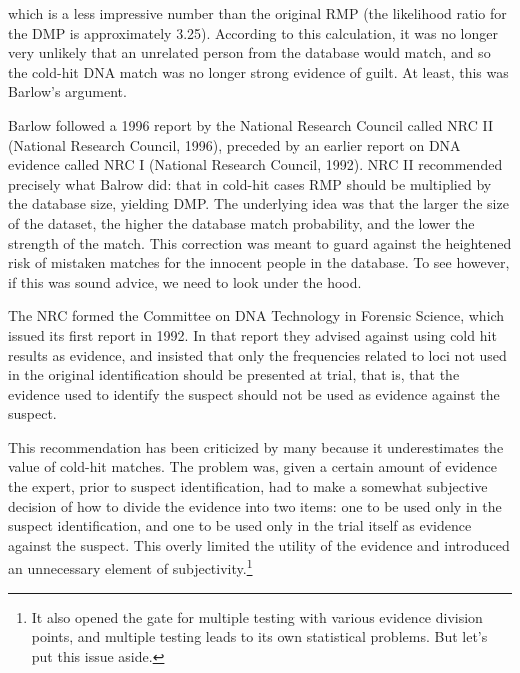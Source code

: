 \documentclass[10pt,dvipsnames,enabledeprecatedfontcommands]{scrartcl}
\begin{document}
\noindent which is a less impressive number than the original RMP (the
likelihood ratio for the DMP is approximately 3.25). According to this
calculation, it was no longer very unlikely that an unrelated person
from the database would match, and so the cold-hit DNA match was no
longer strong evidence of guilt. At least, this was Barlow's argument.

Barlow followed a 1996 report by the National Research Council called
NRC II (National Research Council, 1996), preceded by an earlier report
on DNA evidence called NRC I (National Research Council, 1992). NRC II
recommended precisely what Balrow did: that in cold-hit cases RMP should
be multiplied by the database size, yielding DMP. The underlying idea
was that the larger the size of the dataset, the higher the database
match probability, and the lower the strength of the match. This
correction was meant to guard against the heightened risk of mistaken
matches for the innocent people in the database. To see however, if this
was sound advice, we need to look under the hood.

The NRC formed the Committee on DNA Technology in Forensic Science,
which issued its first report in 1992. In that report they advised
against using cold hit results as evidence, and insisted that only the
frequencies related to loci not used in the original identification
should be presented at trial, that is, that the evidence used to
identify the suspect should not be used as evidence against the suspect.

This recommendation has been criticized by many because it
underestimates the value of cold-hit matches. The problem was, given a
certain amount of evidence the expert, prior to suspect identification,
had to make a somewhat subjective decision of how to divide the evidence
into two items: one to be used only in the suspect identification, and
one to be used only in the trial itself as evidence against the suspect.
This overly limited the utility of the evidence and introduced an
unnecessary element of
subjectivity.\footnote{It also opened the gate for multiple testing with various evidence division points, and multiple testing leads to its own statistical problems. But let's put this issue aside.}
\end{document}
